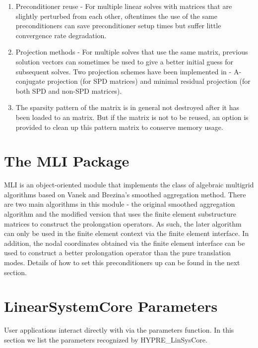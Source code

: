 \begin{enumerate}
\item Preconditioner reuse - For multiple linear solves with matrices that are
      slightly perturbed from each other, oftentimes the use of the same 
      preconditioners can save preconditioner setup times but suffer little
      convergence rate degradation.
\item Projection methods - For multiple solves that use the same matrix,
      previous solution vectors can sometimes be used to give a better initial
      guess for subsequent solves.  Two projection schemes have been implemented
      in \hypre{} - A-conjugate projection (for SPD matrices) and minimal residual
      projection (for both SPD and non-SPD matrices).
\item The sparsity pattern of the matrix is in general not destroyed after
      it has been loaded to an \hypre{} matrix.  But if the matrix is not to
      be reused, an option is provided to clean up this pattern matrix to
      conserve memory usage.
\end{enumerate}

\section{The MLI Package}

MLI is an object-oriented module that implements the class of algebraic
multigrid algorithms based on Vanek and Brezina's smoothed aggregation
method.  There are two main algorithms in this module - the original
smoothed aggregation algorithm and the modified version that uses
the finite element substructure matrices to construct the prolongation
operators.  As such, the later algorithm can only be used in the
finite element context via the finite element interface.  In addition,
the nodal coordinates obtained via the finite element interface can be
used to construct a better prolongation operator than the pure 
translation modes. Details of how to set this preconditioners up can be
found in the next section.

\section{\hypre{} LinearSystemCore Parameters}

User applications interact directly with \hypre{} via the {\sf parameters}
function. In this section we list the parameters recognized by
{\sf HYPRE\_LinSysCore}.

